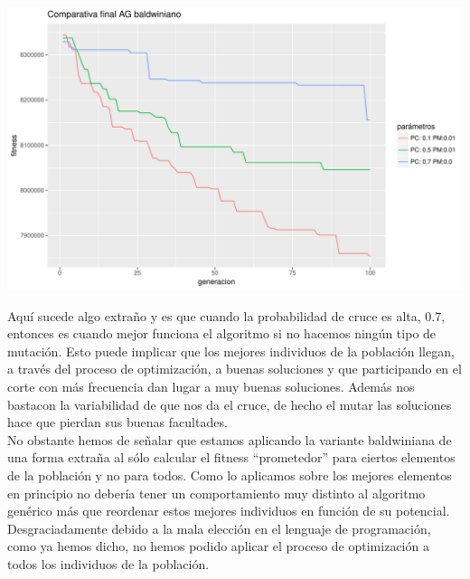 \documentclass[10pt,a4paper]{article}
\begin{document}
\includegraphics[width = \textwidth]{img/graphics/GAbaldwinFinal.pdf}

Aquí sucede algo extraño y es que cuando la probabilidad de cruce es alta, 0.7, entonces es cuando mejor funciona el algoritmo si no hacemos ningún tipo de mutación. Esto puede implicar que los mejores individuos de la población llegan, a través del proceso de optimización, a buenas soluciones y que participando en el corte con más frecuencia dan lugar a muy buenas soluciones. Además nos bastacon la variabilidad de que nos da el cruce, de hecho el mutar las soluciones hace que pierdan sus buenas facultades.\\

No obstante hemos de señalar que estamos aplicando la variante baldwiniana de una forma extraña al sólo calcular el fitness ``prometedor'' para ciertos elementos de la población y no para todos. Como lo aplicamos sobre los mejores elementos en principio no debería tener un comportamiento muy distinto al algoritmo genérico más que reordenar estos mejores individuos en función de su potencial. Desgraciadamente debido a la mala elección en el lenguaje de programación, como ya hemos dicho, no hemos podido aplicar el proceso de optimización a todos los individuos de la población.
\end{document}
